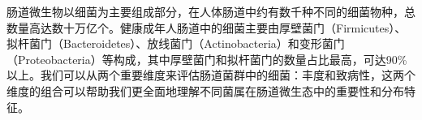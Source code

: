 \documentclass[UTF8]{ctexart}
\begin{document}
\begin{tcolorbox}[
    enhanced,
    colback=customTealBg,
    colframe=customTealBg,
    arc=3mm,
    boxrule=0pt,
    width=\textwidth,
    top=8pt,
    bottom=8pt
]
{\small{\color{customTeal}\faInfoCircle} 肠道微生物以细菌为主要组成部分，在人体肠道中约有数千种不同的细菌物种，总数量高达数十万亿个。健康成年人肠道中的细菌主要由厚壁菌门（Firmicutes）、拟杆菌门（Bacteroidetes）、放线菌门（Actinobacteria）和变形菌门（Proteobacteria）等构成，其中厚壁菌门和拟杆菌门的数量占比最高，可达90\%以上。我们可以从两个重要维度来评估肠道菌群中的细菌：丰度和致病性，这两个维度的组合可以帮助我们更全面地理解不同菌属在肠道微生态中的重要性和分布特征。
}
\end{tcolorbox}


\end{document}
